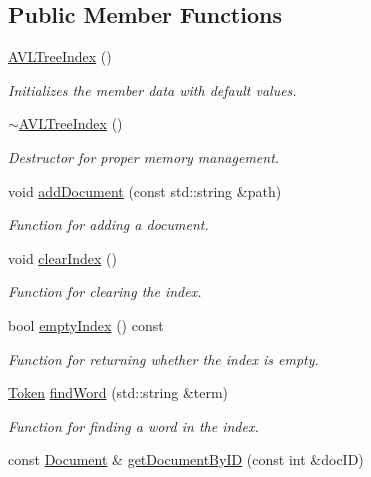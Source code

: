 \subsection*{Public Member Functions}
\begin{DoxyCompactItemize}
\item 
\hyperlink{class_a_v_l_tree_index_aba8dc551ea4963a8082991f52bb19c25}{A\+V\+L\+Tree\+Index} ()
\begin{DoxyCompactList}\small\item\em Initializes the member data with default values. \end{DoxyCompactList}\item 
\hyperlink{class_a_v_l_tree_index_a33cfafc8516541f0d135c707955588f7}{$\sim$\+A\+V\+L\+Tree\+Index} ()
\begin{DoxyCompactList}\small\item\em Destructor for proper memory management. \end{DoxyCompactList}\item 
void \hyperlink{class_a_v_l_tree_index_a1f84720f7580bd785a11d0e0425bd537}{add\+Document} (const std\+::string \&path)
\begin{DoxyCompactList}\small\item\em Function for adding a document. \end{DoxyCompactList}\item 
void \hyperlink{class_a_v_l_tree_index_a1a877f264d30b657f37c6ed070d2e250}{clear\+Index} ()
\begin{DoxyCompactList}\small\item\em Function for clearing the index. \end{DoxyCompactList}\item 
bool \hyperlink{class_a_v_l_tree_index_a447e5741c289869d5a5188def065fb6c}{empty\+Index} () const 
\begin{DoxyCompactList}\small\item\em Function for returning whether the index is empty. \end{DoxyCompactList}\item 
\hyperlink{class_token}{Token} \hyperlink{class_a_v_l_tree_index_ab549fb6b9fdf08926540f6652859d442}{find\+Word} (std\+::string \&term)
\begin{DoxyCompactList}\small\item\em Function for finding a word in the index. \end{DoxyCompactList}\item 
const \hyperlink{class_document}{Document} \& \hyperlink{class_a_v_l_tree_index_a0716178493a342dd6b790cfa8d01b3fa}{get\+Document\+By\+I\+D} (const int \&doc\+I\+D)

\end{DoxyCompactItemize}

